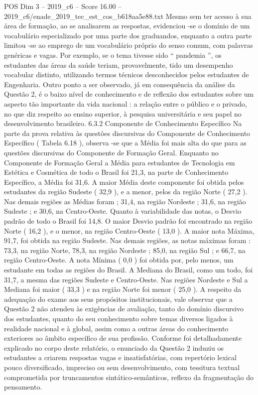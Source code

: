 \begin{textsample}{POS Dim 3 – 2019\_c6 – Score 16.00 – 2019\_c6/enade\_2019\_tec\_est\_cos\_b618aa5e88.txt}
Mesmo sem ter acesso à sua área de formação, ao se analisarem as respostas, evidenciou -se o domínio de um vocabulário especializado por uma parte dos graduandos, enquanto a outra parte limitou -se ao emprego de um vocabulário próprio do senso comum, com palavras genéricas e vagas.
Por exemplo, se o tema tivesse sido “ pandemia ”, os estudantes das áreas da saúde teriam, provavelmente, tido um desempenho vocabular distinto, utilizando termos técnicos desconhecidos pelos estudantes de Engenharia.
Outro ponto a ser observado, já em consequência da análise da Questão 2, é o baixo nível de conhecimento e de reflexão dos estudantes sobre um aspecto tão importante da vida nacional : a relação entre o público e o privado, no que diz respeito ao ensino superior, à pesquisa universitária e seu papel no desenvolvimento brasileiro. 6.3.2 Componente de Conhecimento Específico Na parte da prova relativa às questões discursivas do Componente de Conhecimento Específico ( Tabela 6.18 ), observa -se que a Média foi mais alta do que para as questões discursivas do Componente de Formação Geral.
Enquanto no Componente de Formação Geral a Média para estudantes de Tecnologia em Estética e Cosmética de todo o Brasil foi 21,3, na parte de Conhecimento Específico, a Média foi 31,6.
A maior Média deste componente foi obtida pelos estudantes da região Sudeste ( 32,9 ), e a menor, pelos da região Norte ( 27,2 ).
Nas demais regiões as Médias foram ; 31,4, na região Nordeste ; 31,6, na região Sudeste ; e 30,6, na Centro-Oeste.
Quanto à variabilidade das notas, o Desvio padrão de todo o Brasil foi 14,8.
O maior Desvio padrão foi encontrado na região Norte ( 16,2 ), e o menor, na região Centro-Oeste ( 13,0 ).
A maior nota Máxima, 91,7, foi obtida na região Sudeste.
Nas demais regiões, as notas máximas foram : 73,3, na região Norte, 78,3, na região Nordeste ; 85,0, na região Sul ; e 66,7, na região Centro-Oeste.
A nota Mínima ( 0,0 ) foi obtida por, pelo menos, um estudante em todas as regiões do Brasil.
A Mediana do Brasil, como um todo, foi 31,7, a mesma das regiões Sudeste e Centro-Oeste.
Nas regiões Nordeste e Sul a Mediana foi maior ( 33,3 ) e na região Norte foi menor ( 25,0 ).
A respeito da adequação do exame aos seus propósitos institucionais, vale observar que a Questão 2 não atendeu às exigências de avaliação, tanto do domínio discursivo dos estudantes, quanto do seu conhecimento sobre temas diversos ligados à realidade nacional e à global, assim como a outras áreas do conhecimento exteriores ao âmbito específico de sua profissão.
Conforme foi detalhadamente explicado no corpo deste relatório, o enunciado da Questão 2 induziu os estudantes a criarem respostas vagas e insatisfatórias, com repertório lexical pouco diversificado, impreciso ou sem desenvolvimento, com tessitura textual comprometida por truncamentos sintático-semânticos, reflexo da fragmentação do pensamento.

\end{textsample}
